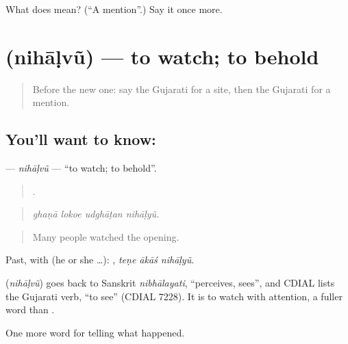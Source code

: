 \begin{tcolorbox}[breakable,colback=teal!4,colframe=teal!35!black,title={Before you move on}]
What does  mean? (\textquotedblleft{}A mention\textquotedblright{}.) Say it once more.
\end{tcolorbox}
\section[\texorpdfstring{\gu{નિહાળવું} (nihāḷvũ)}{નિહાળવું (nihāḷvũ)}]{ (nihāḷvũ) — to watch; to behold}

\label{lesson:GU-C315-nihalvu}



\begin{quote}
Before the new one: say the Gujarati for a site, then the Gujarati for a mention.
\end{quote}

\subsection*{You'll want to know: }
\textbf{} — \emph{nihāḷvũ} — \textquotedblleft{}to watch; to behold\textquotedblright{}.

\begin{quote}
   .
\end{quote}

\begin{quote}
\emph{ghaṇā lokoe udghāṭan nihāḷyũ.}
\end{quote}

\begin{quote}
Many people watched the opening.
\end{quote}

Past, with  (he or she …):   , \emph{teṇe ākāś nihāḷyũ}.

\begin{cousinweb}
\textbf{} (\emph{nihāḷvũ}) goes back to Sanskrit \emph{nibhālayati}, \textquotedblleft{}perceives, sees\textquotedblright{}, and CDIAL lists the Gujarati verb, \textquotedblleft{}to see\textquotedblright{} (CDIAL 7228). It is to watch with attention, a fuller word than \textbf{}.
\end{cousinweb}

\begin{grammarlens}[title={What you've built}]
One more word for telling what happened.
\end{grammarlens}

